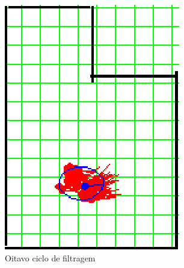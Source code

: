 \begin{figure}[H]
  \centering
  \includegraphics[scale=1]{figuras/cen4_ex1/9.eps}
  \caption[Oitavo Ciclo de Filtragem]{Oitavo ciclo de filtragem}
  \label{img:cen4_ex1_9}
\end{figure}

